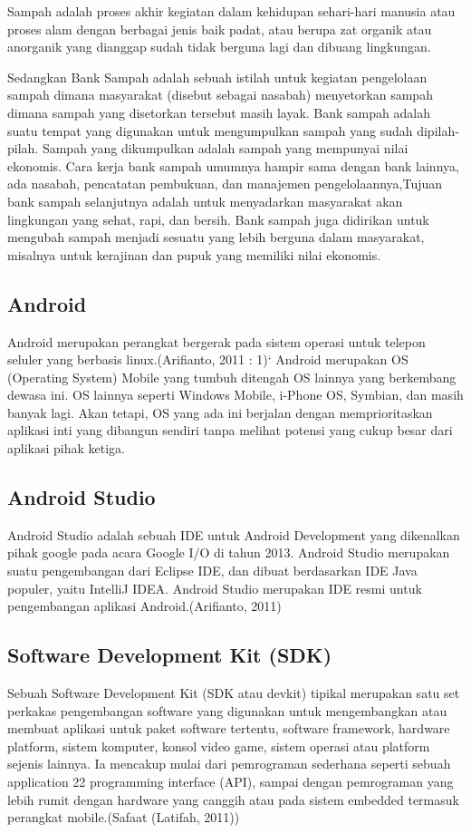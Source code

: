 Sampah adalah proses akhir kegiatan dalam kehidupan sehari-hari manusia atau proses alam dengan berbagai jenis baik padat, atau berupa zat organik atau anorganik yang dianggap sudah tidak berguna lagi dan dibuang lingkungan.

Sedangkan Bank Sampah adalah sebuah istilah untuk kegiatan pengelolaan sampah dimana masyarakat (disebut sebagai nasabah) menyetorkan sampah dimana sampah yang disetorkan tersebut masih layak. Bank sampah adalah suatu tempat yang digunakan untuk mengumpulkan sampah yang sudah dipilah-pilah. Sampah yang dikumpulkan adalah sampah yang mempunyai nilai ekonomis. Cara kerja bank sampah umumnya hampir sama dengan bank lainnya, ada nasabah, pencatatan pembukuan, dan manajemen pengelolaannya,Tujuan bank sampah selanjutnya adalah untuk menyadarkan masyarakat akan lingkungan yang sehat, rapi, dan bersih. Bank sampah juga didirikan untuk mengubah sampah menjadi sesuatu yang lebih berguna dalam masyarakat, misalnya untuk kerajinan dan pupuk yang memiliki nilai ekonomis.

\subsection{Android}
Android merupakan perangkat bergerak pada sistem operasi untuk telepon seluler yang berbasis linux.(Arifianto, 2011 : 1)`
Android merupakan OS (Operating System) Mobile yang tumbuh ditengah OS lainnya yang berkembang dewasa ini. OS lainnya seperti Windows Mobile, i-Phone OS, Symbian, dan masih banyak lagi. Akan tetapi, OS yang ada ini berjalan dengan memprioritaskan aplikasi inti yang dibangun sendiri tanpa melihat potensi yang cukup besar dari aplikasi pihak ketiga.

\subsection{Android Studio}
Android Studio adalah sebuah IDE untuk Android Development yang dikenalkan pihak google pada acara Google I/O di tahun 2013.
Android Studio merupakan suatu pengembangan dari Eclipse IDE, dan dibuat berdasarkan IDE Java populer, yaitu IntelliJ IDEA. Android Studio merupakan IDE resmi untuk pengembangan aplikasi Android.(Arifianto, 2011)

\subsection{Software Development Kit (SDK)}
Sebuah Software Development Kit (SDK atau devkit) tipikal merupakan satu set perkakas pengembangan software yang digunakan
untuk mengembangkan atau membuat aplikasi untuk paket software tertentu, software framework, hardware platform, sistem komputer, konsol video game, sistem operasi atau platform sejenis lainnya. Ia mencakup mulai dari pemrograman sederhana seperti sebuah application 22 programming interface (API), sampai dengan pemrograman yang lebih rumit dengan hardware yang canggih atau pada sistem embedded termasuk perangkat mobile.(Safaat (Latifah, 2011))

